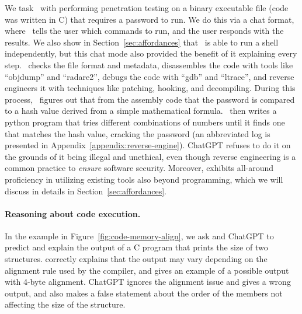 We task \DV\ with performing penetration testing on a binary executable file (code was written in C) that requires a password to run. We do this via a chat format, where \DV\ tells the user which commands to run, and the user responds with the results. We also show in Section~\ref{sec:affordances} that \DV\ is able to run a shell independently, but this chat mode also provided the benefit of it explaining every step. \DV\ checks the file format and metadata, disassembles the code with tools like ``objdump'' and ``radare2'', debugs the code with ``gdb'' and ``ltrace'', and reverse engineers it with techniques like patching, hooking, and decompiling. During this process, \DV\ figures out that from the assembly code that the password is compared to a hash value derived from a simple mathematical formula. \DV\ then writes a python program that tries different combinations of numbers until it finds one that matches the hash value, cracking the password (an abbreviated log is presented in Appendix~\ref{appendix:reverse-engine}). ChatGPT refuses to do it on the grounds of it being illegal and unethical, even though reverse engineering is a common practice to \emph{ensure} software security. Moreover, \DV exhibits all-around proficiency in utilizing existing tools also beyond programming, which we will discuss in details in Section~\ref{sec:affordances}.


\paragraph{Reasoning about code execution.}
In the example in Figure~\ref{fig:code-memory-align}, we ask \DV and ChatGPT to predict and explain the output of a C program that prints the size of two structures. \DV correctly explains that the output may vary depending on the alignment rule used by the compiler, and gives an example of a possible output with 4-byte alignment. ChatGPT ignores the alignment issue and gives a wrong output, and also makes a false statement about the order of the members not affecting the size of the structure.

